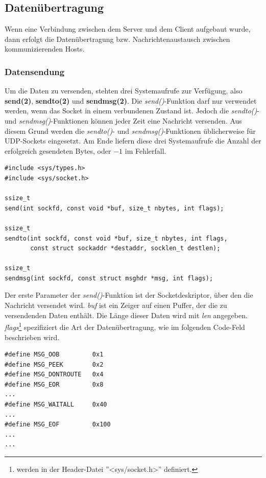 \subsection{Datenübertragung}

Wenn eine Verbindung zwischen dem Server und dem Client aufgebaut wurde, dann erfolgt die Datenübertragung bzw. Nachrichtenaustausch zwischen kommunizierenden Hosts. 

\subsubsection{Datensendung}\label{sub:datensendung}

Um die Daten zu versenden, stehten drei Systemaufrufe zur Verfügung, also \textbf{send(2)}, \textbf{sendto(2)} und \textbf{sendmsg(2)}. Die \textit{send()}-Funktion darf nur verwendet werden, wenn das Socket in einem verbundenen Zustand ist. Jedoch die \textit{sendto()}- und \textit{sendmsg()}-Funktionen können jeder Zeit eine Nachricht versenden. Aus diesem Grund werden die \textit{sendto()}- und \textit{sendmsg()}-Funktionen üblicherweise für UDP-Sockets eingesetzt. Am Ende liefern diese drei Systemaufrufe die Anzahl der erfolgreich gesendeten Bytes, oder $-1$ im Fehlerfall. \smallskip \smallskip

\begin{verbatim}
#include <sys/types.h>
#include <sys/socket.h>

ssize_t
send(int sockfd, const void *buf, size_t nbytes, int flags);

ssize_t
sendto(int sockfd, const void *buf, size_t nbytes, int flags,
       const struct sockaddr *destaddr, socklen_t destlen);

ssize_t
sendmsg(int sockfd, const struct msghdr *msg, int flags);
\end{verbatim}
\smallskip \smallskip

Der erste Parameter der \textit{send()}-Funktion ist der Socketdeskriptor, über den die Nachricht versendet wird. \textit{buf} ist ein Zeiger auf einen Puffer, der die zu versendenden Daten enthält. Die Länge dieser Daten wird mit \textit{len} angegeben. \textit{flags}\footnote{werden in der Header-Datei ''<sys/socket.h>'' definiert.} spezifiziert die Art der Datenübertragung, wie im folgenden Code-Feld beschrieben wird. \smallskip \smallskip

\begin{verbatim}
#define MSG_OOB         0x1
#define MSG_PEEK        0x2  
#define MSG_DONTROUTE   0x4  
#define MSG_EOR         0x8 
... 
#define MSG_WAITALL     0x40 
...
#define MSG_EOF         0x100 
...
...
\end{verbatim}
\smallskip \smallskip

